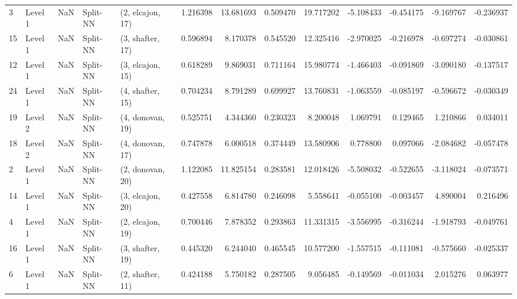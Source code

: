 \begin{tabular}{llrllrrrrrrrr}
3  &   Level 1 &    NaN &       Split-NN &  (2, elcajon, 17) &   1.216398 &  13.681693 &  0.509470 &  19.717202 &            -5.108433 &              -0.454175 &           -9.169767 &             -0.236937 \\
15 &   Level 1 &    NaN &       Split-NN &  (3, shafter, 17) &   0.596894 &   8.170378 &  0.545520 &  12.325416 &            -2.970025 &              -0.216978 &           -0.697274 &             -0.030861 \\
12 &   Level 1 &    NaN &       Split-NN &  (3, elcajon, 15) &   0.618289 &   9.869031 &  0.711164 &  15.980774 &            -1.466403 &              -0.091869 &           -3.090180 &             -0.137517 \\
24 &   Level 1 &    NaN &       Split-NN &  (4, shafter, 15) &   0.704234 &   8.791289 &  0.699927 &  13.760831 &            -1.063559 &              -0.085197 &           -0.596672 &             -0.030349 \\
19 &   Level 2 &    NaN &       Split-NN &  (4, donovan, 19) &   0.525751 &   4.344360 &  0.230323 &   8.200048 &             1.069791 &               0.129465 &            1.210866 &              0.034011 \\
18 &   Level 2 &    NaN &       Split-NN &  (4, donovan, 17) &   0.747878 &   6.000518 &  0.374449 &  13.580906 &             0.778800 &               0.097066 &           -2.084682 &             -0.057478 \\
2  &   Level 1 &    NaN &       Split-NN &  (2, donovan, 20) &   1.122085 &  11.825154 &  0.283581 &  12.018426 &            -5.508032 &              -0.522655 &           -3.118024 &             -0.073571 \\
14 &   Level 1 &    NaN &       Split-NN &  (3, elcajon, 20) &   0.427558 &   6.814780 &  0.246098 &   5.558641 &            -0.055100 &              -0.003457 &            4.890004 &              0.216496 \\
4  &   Level 1 &    NaN &       Split-NN &  (2, elcajon, 19) &   0.700446 &   7.878352 &  0.293863 &  11.331315 &            -3.556995 &              -0.316244 &           -1.918793 &             -0.049761 \\
16 &   Level 1 &    NaN &       Split-NN &  (3, shafter, 19) &   0.445320 &   6.244040 &  0.465545 &  10.577200 &            -1.557515 &              -0.111081 &           -0.575660 &             -0.025337 \\
6  &   Level 1 &    NaN &       Split-NN &  (2, shafter, 11) &   0.424188 &   5.750182 &  0.287505 &   9.056485 &            -0.149569 &              -0.011034 &            2.015276 &              0.063977 \\

\end{tabular}
